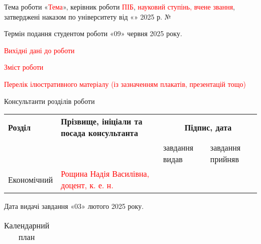 \begin{shiftedemun}
    \item 
    Тема роботи «\textcolor{red}{Тема}», керівник роботи \textcolor{red}{ПІБ}, \textcolor{red}{науковий ступінь, вчене звання}, затверджені наказом по університету від «\underline{\hspace{0.7cm}}» \underline{\hspace{2.8cm}} 2025 р. № \underline{\hspace{1.5cm}}
    
    \item
    Термін подання студентом роботи «09» червня 2025 року.
    
    \item
    \textcolor{red}{Вихідні дані до роботи} 

    \item
    \textcolor{red}{Зміст роботи} 

    \item
    \textcolor{red}{Перелік ілюстративного матеріалу (із зазначенням плакатів, презентацій тощо)} 

    \item
    Консультанти розділів роботи\\
    \noindent %
    \begin{tabular}{|m{}|m{}|m{}|m{}|} %
        \hline
        \centering\arraybackslash \textbf{Розділ} & \centering\arraybackslash \textbf{Прізвище, ініціали та посада консультанта} & \multicolumn{2}{c|}{\centering\arraybackslash \textbf{Підпис, дата}} \\
        \cline{3-4} %
        & & \centering\arraybackslash завдання видав & \centering\arraybackslash завдання прийняв \\
        \hline
        \centering\arraybackslash Економічний & \textcolor{red}{Рощина Надія Василівна, доцент, к. е. н.} & \centering\arraybackslash  & \centering\arraybackslash  \\
        \hline
    \end{tabular}

    \item
    Дата видачі завдання «03» лютого 2025 року.\\
    \begin{table}[h!]
    \caption*{Календарний план}
    \begin{tabular}{|m{}|m{}|m{}|m{}|}
        

\end{tabular}
\end{table}
\end{shiftedemun}

